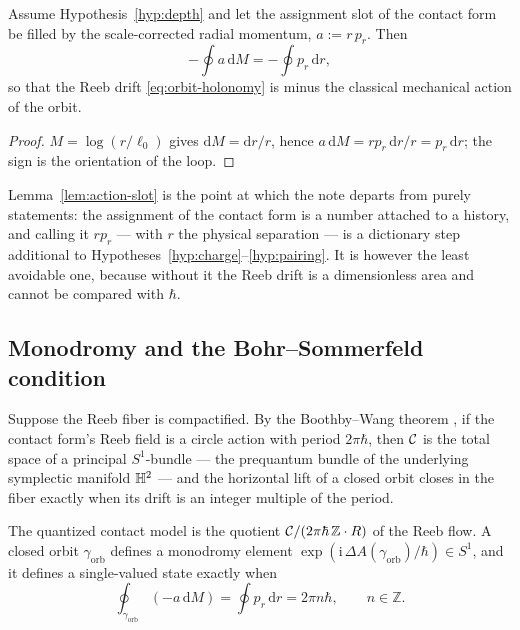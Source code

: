 \begin{lemma}
\label{lem:action-slot}
Assume Hypothesis~\ref{hyp:depth} and let the assignment slot of the contact
form be filled by the scale-corrected radial momentum, $a:=r\,p_r$.  Then
\begin{equation}\label{eq:action-form}
  -\oint a\,\mathrm dM=-\oint p_r\,\mathrm dr ,
\end{equation}
so that the Reeb drift \eqref{eq:orbit-holonomy} is minus the classical
mechanical action of the orbit.
\end{lemma}

\begin{proof}
$M=\log(r/\ell_0)$ gives $\mathrm dM=\mathrm dr/r$, hence
$a\,\mathrm dM=r p_r\,\mathrm dr/r=p_r\,\mathrm dr$; the sign is the orientation
of the loop.
\end{proof}

\begin{warning}
\label{warn:action-slot}
Lemma~\ref{lem:action-slot} is the point at which the note departs from purely
\AEG{} statements: the assignment of the contact form is a number attached to a
history, and calling it $r p_r$ --- with $r$ the physical separation --- is a
dictionary step additional to Hypotheses~\ref{hyp:charge}--\ref{hyp:pairing}.  It
is however the least avoidable one, because without it the Reeb drift is a
dimensionless area and cannot be compared with $\hbar$.
\end{warning}

\subsection{Monodromy and the Bohr--Sommerfeld condition}

Suppose the Reeb fiber is compactified.  By the Boothby--Wang theorem
\cite{BoothbyWang1958,Geiges2008}, if the contact form's Reeb field is a
circle action with period $2\pi\hbar$, then $\mathcal{C}$ is the total space of a
principal $S^{1}$-bundle --- the prequantum bundle of the underlying symplectic
manifold $\mathbb{H}^2$ --- and the horizontal lift of a closed orbit closes in the
fiber exactly when its drift is an integer multiple of the period.

\begin{definition}
\label{def:monodromy}
The quantized contact model is the quotient $\mathcal{C}/(2\pi\hbar\,\mathbb Z\cdot R)$
of the Reeb flow.  A closed orbit $\gamma_{\mathrm{orb}}$ defines a monodromy
element $\exp(\mathrm i\,\Delta A(\gamma_{\mathrm{orb}})/\hbar)\in S^{1}$, and it
defines a single-valued state exactly when
\begin{equation}\label{eq:bohr-sommerfeld}
  \oint_{\gamma_{\mathrm{orb}}}(-a\,\mathrm dM)
  =\oint p_r\,\mathrm dr
  =2\pi n\hbar ,
  \qquad n\in\mathbb Z .
\end{equation}
\end{definition}

